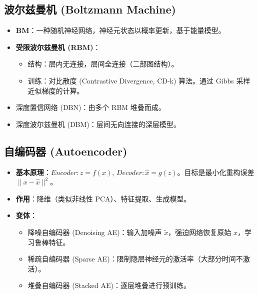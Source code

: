 \documentclass[a4paper, 11pt]{ctexart}
\begin{document}
\subsection{波尔兹曼机 (Boltzmann Machine)}
\begin{itemize}
    \item \textbf{BM}：一种随机神经网络，神经元状态以概率更新，基于能量模型。
    \item \textbf{受限波尔兹曼机 (RBM)}：
    \begin{itemize}
        \item 结构：层内无连接，层间全连接（二部图结构）。
        \item 训练：对比散度 (Contrastive Divergence, CD-k) 算法。通过 Gibbs 采样近似梯度的计算。
    \end{itemize}
    \item 深度置信网络 (DBN)：由多个 RBM 堆叠而成。
    \item 深度波尔兹曼机 (DBM)：层间无向连接的深层模型。
\end{itemize}

\subsection{自编码器 (Autoencoder)}
\begin{itemize}
    \item \textbf{基本原理}：$Encoder: z=f(x)$, $Decoder: \hat{x}=g(z)$。目标是最小化重构误差 $\|x - \hat{x}\|^2$。
    \item \textbf{作用}：降维（类似非线性 PCA）、特征提取、生成模型。
    \item \textbf{变体}：
    \begin{itemize}
        \item 降噪自编码器 (Denoising AE)：输入加噪声 $\tilde{x}$，强迫网络恢复原始 $x$，学习鲁棒特征。
        \item 稀疏自编码器 (Sparse AE)：限制隐层神经元的激活率（大部分时间不激活）。
        \item 堆叠自编码器 (Stacked AE)：逐层堆叠进行预训练。
    \end{itemize}
\end{itemize}
\end{document}
